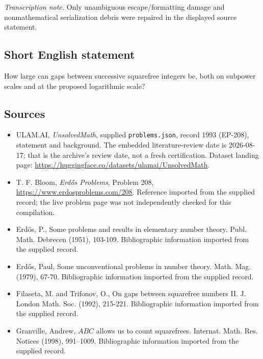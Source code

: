 \documentclass[11pt,a4paper]{article}
\begin{document}
{\small\emph{Transcription note.} Only unambiguous escape/formatting damage and nonmathematical serialization debris were repaired in the displayed source statement.}

\subsection{Short English statement}

How large can gaps between successive squarefree integers be, both on subpower scales and at the proposed logarithmic scale?

\subsection{Sources}

{\small

\begin{itemize}

\item[\hypertarget{source:1993:1}{S1}] ULAM.AI, \emph{UnsolvedMath}, supplied \texttt{problems.json}, record 1993 (EP-208), statement and background. The embedded literature-review date is 2026-08-17; that is the archive’s review date, not a fresh certification. Dataset landing page: \url{https://huggingface.co/datasets/ulamai/UnsolvedMath}.

\item[\hypertarget{source:1993:2}{S2}] T. F. Bloom, \emph{Erdős Problems}, Problem 208, \url{https://www.erdosproblems.com/208}. Reference imported from the supplied record; the live problem page was not independently checked for this compilation.

\item[\hypertarget{source:1993:3}{S3}] Erd\"{o}s, P., Some problems and results in elementary number theory. Publ. Math. Debrecen (1951), 103-109. Bibliographic information imported from the supplied record.

\item[\hypertarget{source:1993:4}{S4}] Erd\H{o}s, Paul, Some unconventional problems in number theory. Math. Mag. (1979), 67-70. Bibliographic information imported from the supplied record.

\item[\hypertarget{source:1993:5}{S5}] Filaseta, M. and Trifonov, O., On gaps between squarefree numbers II. J. London Math. Soc. (1992), 215-221. Bibliographic information imported from the supplied record.

\item[\hypertarget{source:1993:6}{S6}] Granville, Andrew, {$ABC$} allows us to count squarefrees. Internat. Math. Res. Notices (1998), 991--1009. Bibliographic information imported from the supplied record.

\end{itemize}

}

\label{end:1993}
\end{document}
